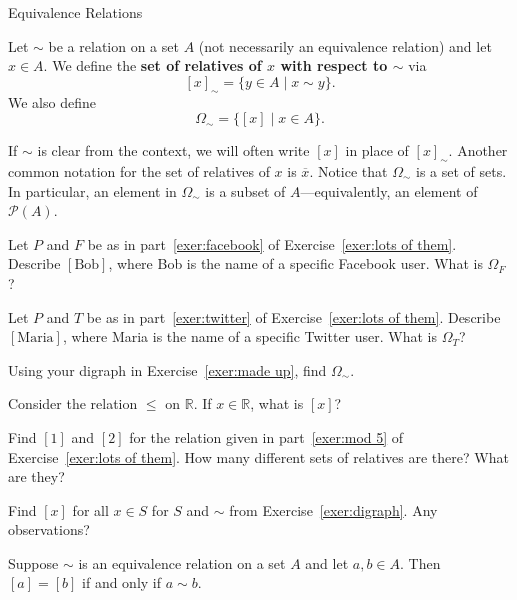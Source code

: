 \begin{section}{Equivalence Relations}
\begin{definition}\label{def:relatives}
Let $\sim$ be a relation on a set $A$ (not necessarily an equivalence relation) and let $x\in A$.  We define the \textbf{set of relatives of $x$ with respect to $\sim$} via
\[
[x]_{\sim}=\{y\in A\mid x\sim y\}.
\]
We also define
\[
\Omega_{\sim}=\{[x]\mid x\in A\}.
\]
\end{definition}

If $\sim$ is clear from the context, we will often write $[x]$ in place of $[x]_{\sim}$. Another common notation for the set of relatives of $x$ is $\overline{x}$. Notice that $\Omega_{\sim}$ is a set of sets.  In particular, an element in $\Omega_{\sim}$ is a subset of $A$---equivalently, an element of $\mathcal{P}(A)$.

\begin{exercise}
Let $P$ and $F$ be as in part~\ref{exer:facebook} of Exercise~\ref{exer:lots of them}.  Describe $[\text{Bob}]$, where Bob is the name of a specific Facebook user.  What is $\Omega_F$?
\end{exercise}

\begin{exercise}
Let $P$ and $T$ be as in part~\ref{exer:twitter} of Exercise~\ref{exer:lots of them}.  Describe $[\text{Maria}]$, where Maria is the name of a specific Twitter user.  What is $\Omega_T$?
\end{exercise}

\begin{exercise}
Using your digraph in Exercise~\ref{exer:made up}, find $\Omega_{\sim}$.  
\end{exercise}

\begin{exercise}
Consider the relation $\leq$ on $\mathbb{R}$.  If $x\in \mathbb{R}$, what is $[x]$?
\end{exercise}

\begin{exercise}\label{exer:mod5classes}
Find $[1]$ and $[2]$ for the relation given in part~\ref{exer:mod 5} of Exercise~\ref{exer:lots of them}.  How many different sets of relatives are there?  What are they?
\end{exercise}

\begin{exercise}
Find $[x]$ for all $x\in S$ for $S$ and $\sim$ from Exercise~\ref{exer:digraph}.  Any observations?
\end{exercise}

\begin{theorem}\label{thm:related if and only if same class}
Suppose $\sim$ is an equivalence relation on a set $A$ and let $a,b\in A$.  Then $[a]=[b]$ if and only if $a\sim b$.
\end{theorem}


\end{section}
